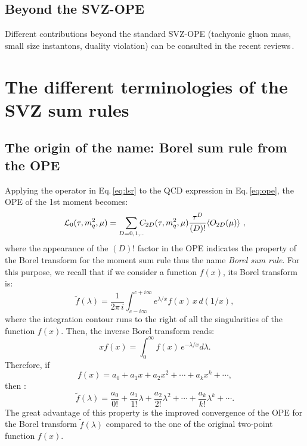 \documentclass[aps,prd,groupedaddress,nofootinbib]{revtex4-1}
\def\beq{\begin{equation}}
\def\eeq{\end{equation}}
\def\la{\langle}
\def\ra{\rangle}
\begin{document}
\subsection{Beyond the SVZ-OPE}
Different contributions beyond the standard SVZ-OPE (tachyonic gluon mass, small size instantons, duality violation) can be consulted in the recent reviews\,\cite{SNREV21,SNREV22}.
\section{The different terminologies of the SVZ sum rules}
\subsection{The origin of the name: Borel sum rule from the OPE}
Applying the operator in Eq.\,\ref{eq:lsr} to the QCD expression in Eq.\,\ref{eq:ope}, the OPE of the 1st moment becomes:
\beq
{\cal L}_0(\tau,m_q^2,\mu)= \sum_{D=0,1,..}\hspace*{-0.25cm}C_{2D}(\tau,m_q^2,\mu)\frac{\tau^{D}}{(D)!}\la O_{2D}(\mu)\ra~,
\eeq
where the appearance of the $(D)!$ factor in the OPE indicates the property of the Borel transform for the moment sum rule thus the name {\it Borel sum rule}.   For this purpose, we recall that if we consider a function $f(x)$, its Borel transform  is:
\beq
\tilde f(\lambda)=\frac{1}{2\pi\,i }\int_{c-i\infty}^{c+i\infty}e^{\lambda/x}f(x)\,x\,d(1/x),
\eeq
where the integration contour runs to the right of all the singularities of the function $f(x)$. Then, the inverse Borel transform reads:
\beq
xf(x) = \int_0^\infty f(x)\,e^{-\lambda/x} d\lambda.
\eeq
Therefore, if 
\beq
f(x)=a_0+a_1x+a_2x^2+\cdots+a_kx^k+\cdots,
\eeq
 then :
 \beq
 \tilde f(\lambda)=\frac{a_0}{0!}+\frac{a_1}{1!}\lambda+\frac{a_2}{2!}\lambda^2+\cdots+\frac{a_k}{k!}\lambda^k+\cdots.
 \eeq
 The great advantage of this property is the improved convergence of the OPE for the Borel transform $\tilde f(\lambda)$ compared to the one of the original two-point function $f(x)$. 
\end{document}
